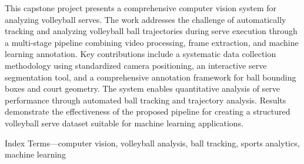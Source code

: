 This capstone project presents a comprehensive computer vision system for analyzing volleyball serves. The work addresses the challenge of automatically tracking and analyzing volleyball ball trajectories during serve execution through a multi-stage pipeline combining video processing, frame extraction, and machine learning annotation. Key contributions include a systematic data collection methodology using standardized camera positioning, an interactive serve segmentation tool, and a comprehensive annotation framework for ball bounding boxes and court geometry. The system enables quantitative analysis of serve performance through automated ball tracking and trajectory analysis. Results demonstrate the effectiveness of the proposed pipeline for creating a structured volleyball serve dataset suitable for machine learning applications.

Index Terms—computer vision, volleyball analysis, ball tracking, sports analytics, machine learning
